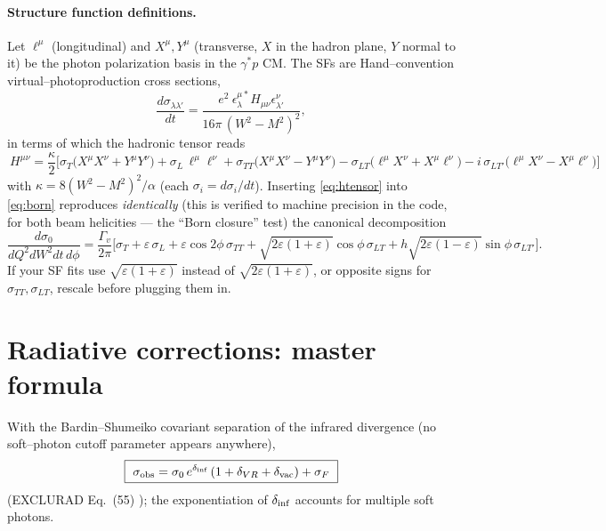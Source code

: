 \documentclass[11pt]{article}
\begin{document}
\paragraph{Structure function definitions.}
Let $\ell^\mu$ (longitudinal) and $X^\mu,Y^\mu$ (transverse, $X$ in the
hadron plane, $Y$ normal to it) be the photon polarization basis in the
$\gamma^*p$ CM. The SFs are Hand--convention virtual--photoproduction cross
sections,
\begin{equation}
\frac{d\sigma_{\lambda\lambda'}}{dt}
=\frac{e^2\ \epsilon_\lambda^{\mu*}H_{\mu\nu}\epsilon_{\lambda'}^{\nu}}
{16\pi\,(W^2-M^2)^2},
\end{equation}
in terms of which the hadronic tensor reads
\begin{equation}
\boxed{\ H^{\mu\nu}=\frac{\kappa}{2}\Big[
\sigma_T\big(X^\mu X^\nu{+}Y^\mu Y^\nu\big)
+\sigma_L\,\ell^\mu \ell^\nu
+\sigma_{TT}\big(X^\mu X^\nu{-}Y^\mu Y^\nu\big)
-\sigma_{LT}\big(\ell^\mu X^\nu{+}X^\mu \ell^\nu\big)
-i\,\sigma_{LT'}\big(\ell^\mu X^\nu{-}X^\mu \ell^\nu\big)
\Big]\ }
\label{eq:htensor}
\end{equation}
with $\kappa=8(W^2-M^2)^2/\alpha$
(each $\sigma_i=d\sigma_i/dt$). Inserting \eqref{eq:htensor} into
\eqref{eq:born} reproduces \emph{identically} (this is verified to machine
precision in the code, for both beam helicities --- the ``Born closure''
test) the canonical decomposition
\begin{equation}
\frac{d\sigma_0}{dQ^2 dW^2 dt\,d\phi}
=\frac{\Gamma_v}{2\pi}\Big[\sigma_T+\varepsilon\,\sigma_L
+\varepsilon\cos2\phi\,\sigma_{TT}
+\sqrt{2\varepsilon(1{+}\varepsilon)}\cos\phi\,\sigma_{LT}
+h\sqrt{2\varepsilon(1{-}\varepsilon)}\sin\phi\,\sigma_{LT'}\Big].
\label{eq:canon}
\end{equation}
If your SF fits use $\sqrt{\varepsilon(1{+}\varepsilon)}$ instead of
$\sqrt{2\varepsilon(1{+}\varepsilon)}$, or opposite signs for
$\sigma_{TT},\sigma_{LT}$, rescale before plugging them in.

\section{Radiative corrections: master formula}

With the Bardin--Shumeiko covariant separation of the infrared divergence
(no soft--photon cutoff parameter appears anywhere),
\begin{equation}
\boxed{\ \sigma_{\rm obs}
=\sigma_0\,e^{\delta_{\rm inf}}\,(1+\delta_{VR}+\delta_{\rm vac})
+\sigma_F\ }
\label{eq:master}
\end{equation}
(EXCLURAD Eq.~(55) \cite{exclurad}); the exponentiation of
$\delta_{\rm inf}$ accounts for multiple soft photons.
\end{document}
